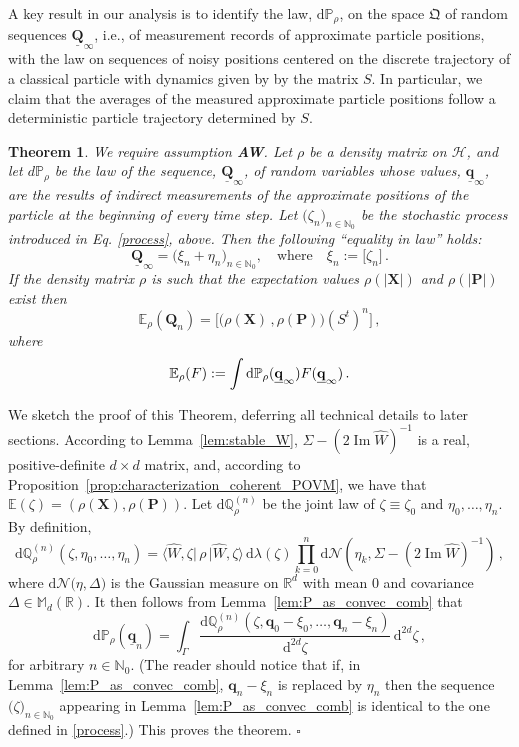 \documentclass[12pt]{article}
\newtheorem{theorem}{Theorem}[section]
\renewcommand{\Im}{\operatorname{Im}}
\renewcommand{\d}{{\mathrm d}}
\begin{document}
A key result in our analysis is to identify the law, $\d\mathbb{P}_{\rho}$, on the space $\mathfrak{Q}$ of random 
sequences $\underline{\mathbf{Q}}_{\infty}$, i.e., of measurement records of approximate particle positions, 
with the law on sequences of noisy positions centered on the discrete trajectory of a classical particle with 
dynamics given by by the matrix $S$. In particular, we claim that the averages of 
the measured approximate particle positions follow a deterministic particle trajectory determined
by $S$.

\begin{theorem}\label{thm:Q_and_AR}
We require assumption {\bf{AW}}. Let $\rho$ be a density matrix on $\mathcal{H}$, and let $d\mathbb{P}_{\rho}$ be the law of the sequence, $\underline{\mathbf{Q}}_{\infty}$, of random variables whose values, $\underline{\mathbf{q}}_{\infty}$, are the results of indirect measurements of the approximate positions of the particle at the beginning of every time step. Let $\big(\zeta_n \big)_{n\in \mathbb{N}_0}$ be the stochastic process introduced in Eq. \eqref{process}, above. Then the following ``equality in law'' holds:
$$\underline{\mathbf{Q}}_{\infty} = \Big( \xi_n + \eta_n \Big)_{n\in \mathbb{N}_0}, \quad \text{where}\quad  \xi_n:=\big[\zeta_{n} \big] \,.$$
If the density matrix $\rho$ is such that the expectation values $\rho(\vert \mathbf{X} \vert)$ and $\rho(\vert \mathbf{P}\vert)$ exist then 
$$\mathbb{E}_{\rho}(\mathbf{Q}_n) = \big[ \big(\rho(\mathbf{X})\,, \rho(\mathbf{P})\big)(S^{t})^{n} \big]\,,$$
where
$$\mathbb{E}_{\rho}(F):=\int \d\mathbb{P}_{\rho}(\underline{\bf{q}}_{\infty}) F(\underline{\mathbf{q}}_{\infty})\,.$$
\end{theorem}     

We sketch the proof of this Theorem, deferring all technical details to later sections. According to Lemma~\ref{lem:stable_W},
$\Sigma-(2\Im\widehat W)^{-1}$ is a real, positive-definite $d\times d$ matrix, and, according to Proposition~\ref{prop:characterization_coherent_POVM}, we have that 
$\mathbb E(\zeta)=(\rho(\mathbf{X}),\rho(\mathbf{P}))$. 
Let $\d\mathbb Q_\rho^{(n)}$ be the joint law of $\zeta \equiv \zeta_0$ and $\eta_0,\dotsc,\eta_n$. By definition,
$$ \d \mathbb Q_\rho^{(n)}(\zeta, \eta_0,\dots, \eta_n)=\langle\widehat{W},\zeta \vert\,\rho\, \vert \widehat{W},\zeta \rangle \,
\d\lambda(\zeta) \prod_{k=0}^n \d \mathcal N(\eta_k,\Sigma-(2\Im\widehat W)^{-1})\,,$$
where $\d \mathcal{N}\big(\eta, \Delta\big)$ is the Gaussian measure on $\mathbb{R}^{d}$ with mean $0$ and covariance 
$\Delta \in \mathbb{M}_{d}(\mathbb{R})$. 
It then follows from Lemma~\ref{lem:P_as_convec_comb} that 
$$\d\mathbb{P}_\rho(\underline{\mathbf{q}}_n) = \int_{\Gamma} 
\frac{\d\mathbb Q_\rho^{(n)}(\zeta, \mathbf q_0 -\xi_0,\dots,\mathbf{q}_n-\xi_n)}{\d^{2d}\zeta} \, \d^{2d}\zeta\,,$$
for arbitrary $n\in \mathbb{N}_0$. (The reader should notice that if, in Lemma~\ref{lem:P_as_convec_comb},  
$\mathbf{q}_n - \xi_n$ is replaced by $\eta_n$ then the sequence $\big( \zeta \big)_{n \in \mathbb{N}_0}$ 
appearing in Lemma~\ref{lem:P_as_convec_comb} is identical to the one defined in \eqref{process}.)
 This proves the theorem.  \hspace{8.5cm}$\square$
 
\end{document}
